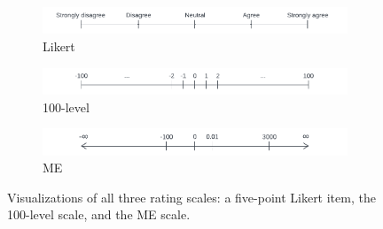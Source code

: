 \begin{figure}
    \centering
    \begin{subfigure}[b]{\textwidth}
        \centering
        \includegraphics[scale=.750]{Figures/scale-likert.pdf}
        \caption{Likert}
        \label{fig:scales-likert}
    \end{subfigure}
    \par\bigskip
    \begin{subfigure}[b]{\textwidth}
        \centering
        \includegraphics[scale=.750]{Figures/scale-100.pdf}
        \caption{100-level}
        \label{fig:scales-100}
    \end{subfigure}
    \par\bigskip
    \begin{subfigure}[b]{\textwidth}
        \centering
        \includegraphics[scale=.750]{Figures/scale-me.pdf}
        \caption{ME}
        \label{fig:scales-me}
    \end{subfigure}
    \caption{Visualizations of all three rating scales: a five-point Likert item, the 100-level scale, and the ME scale.}
    \label{fig:scales}
\end{figure}

